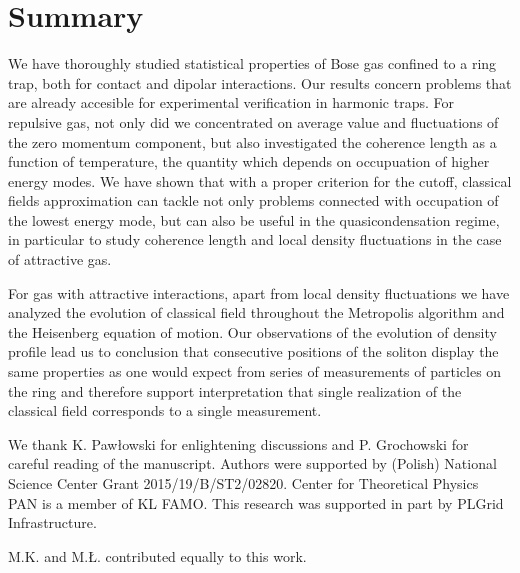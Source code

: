\documentclass[aps,pra,reprint]{revtex4-2}
\begin{document}
\section{Summary}\label{summary}
We have thoroughly studied statistical properties of Bose gas confined to a 
ring trap, both for contact and dipolar interactions. Our results concern 
problems that are already accesible for experimental verification in harmonic 
traps. For repulsive gas, not only did we concentrated on average value and 
fluctuations of the zero momentum component, but also investigated the 
coherence length as a function of temperature, the quantity which depends on 
occupuation of higher energy modes. We have shown that with a proper criterion 
for the cutoff, classical fields approximation can tackle not only problems 
connected with occupation of the lowest energy mode, but can also be useful in 
the quasicondensation regime, in particular to study coherence length and local 
density fluctuations in the case of attractive gas.

For gas with attractive interactions, apart from local density fluctuations we 
have analyzed the evolution of classical field throughout the Metropolis 
algorithm and the Heisenberg equation of motion. Our observations of the 
evolution of density profile lead us to conclusion that consecutive positions 
of the soliton display the same properties as one would expect from series of 
measurements of particles on the ring and therefore support interpretation that 
single realization of the classical field corresponds to a single measurement.
\begin{acknowledgments}
We thank K. Pawłowski for enlightening discussions and P. Grochowski for 
careful reading of the manuscript. Authors were supported by (Polish) National 
Science Center Grant 2015/19/B/ST2/02820. Center for Theoretical Physics PAN is 
a member of KL FAMO. This research was supported in part 
by PLGrid Infrastructure.    
\end{acknowledgments}

M.K. and M.Ł. contributed equally to this work.

\appendix
\onecolumngrid
\end{document}
